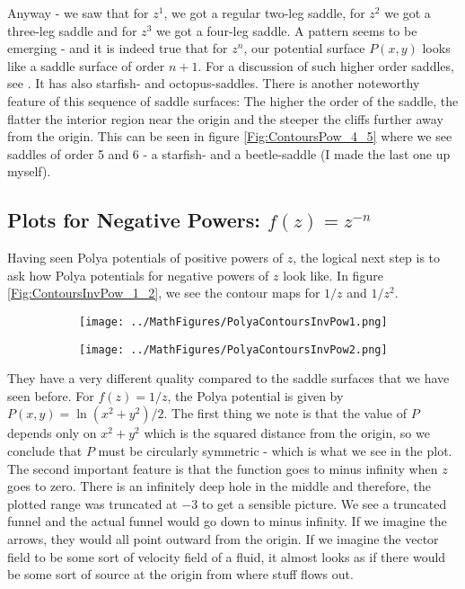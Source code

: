 \documentclass[12pt]{article}
\begin{document}
\medskip
Anyway - we saw that for $z^1$, we got a regular two-leg saddle, for $z^2$ we got a three-leg saddle and for $z^3$ we got a four-leg saddle. A pattern seems to be emerging - and it is indeed true that for $z^n$, our potential surface $P(x,y)$ looks like a saddle surface of order $n+1$. For a discussion of such higher order saddles, see \cite{HighOrderSaddles}. It has also starfish- and octopus-saddles. There is another noteworthy feature of this sequence of saddle surfaces: The higher the order of the saddle, the flatter the interior region near the origin and the steeper the cliffs further away from the origin. This can be seen in figure \ref{Fig:ContoursPow_4_5} where we see saddles of order 5 and 6 - a starfish- and a beetle-saddle (I made the last one up myself).

\subsection{Plots for Negative Powers: $f(z) = z^{-n}$}
Having seen Polya potentials of positive powers of $z$, the logical next step is to ask how Polya potentials for negative powers of $z$ look like. In figure \ref{Fig:ContoursInvPow_1_2}, we see the contour maps for $1/z$ and $1/z^2$. 
\begin{figure}[p]
\caption{Polya potential contours of $f(z) = 1/z$ and $f(z) = 1/z^2$}	
\label{Fig:ContoursInvPow_1_2}	
\centering
\begin{subfigure}[b]{0.49\textwidth}
\centering
\texttt{[image: ../MathFigures/PolyaContoursInvPow1.png]}
\end{subfigure}
\begin{subfigure}[b]{0.49\textwidth}
\centering
\texttt{[image: ../MathFigures/PolyaContoursInvPow2.png]}
\end{subfigure}
\end{figure}
They have a very different quality compared to the saddle surfaces that we have seen before. For $f(z) = 1/z$, the Polya potential is given by $P(x,y) = \ln(x^2+y^2)/2$. The first thing we note is that the value of $P$ depends only on $x^2 + y^2$ which is the squared distance from the origin, so we conclude that $P$ must be circularly symmetric - which is what we see in the plot. The second important feature is that the function goes to minus infinity when $z$ goes to zero. There is an infinitely deep hole in the middle and therefore, the plotted range was truncated at $-3$ to get a sensible picture. We see a truncated funnel and the actual funnel would go down to minus infinity. If we imagine the arrows, they would all point outward from the origin. If we imagine the vector field to be some sort of velocity field of a fluid, it almost looks as if there would be some sort of source at the origin from where stuff flows out. 
\end{document}
